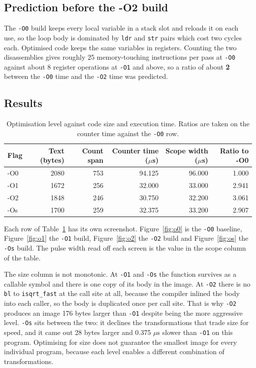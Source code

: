 \documentclass[11pt]{article}
\begin{document}
\subsection{Prediction before the -O2 build}

The \texttt{-O0} build keeps every local variable in a stack slot and reloads it
on each use, so the loop body is dominated by \texttt{ldr} and \texttt{str}
pairs which cost two cycles each. Optimised code keeps the same variables in
registers. Counting the two disassemblies gives roughly 25 memory-touching
instructions per pass at \texttt{-O0} against about 8 register operations at
\texttt{-O1} and above, so a ratio of about \textbf{2} between the \texttt{-O0}
time and the \texttt{-O2} time was predicted.

\subsection{Results}

\begin{table}[H]
\centering
\begin{tabular}{lrrrrr}
\toprule
Flag & Text (bytes) & Count span & Counter time ($\mu$s) & Scope width ($\mu$s) & Ratio to -O0 \\
\midrule
-O0 & 2080 & 753 & 94.125 & 96.000 & 1.000 \\
-O1 & 1672 & 256 & 32.000 & 33.000 & 2.941 \\
-O2 & 1848 & 246 & 30.750 & 32.200 & 3.061 \\
-Os & 1700 & 259 & 32.375 & 33.200 & 2.907 \\
\bottomrule
\end{tabular}
\caption{Optimisation level against code size and execution time. Ratios are
taken on the counter time against the \texttt{-O0} row.}
\label{tab:opt}
\end{table}

Each row of Table~\ref{tab:opt} has its own screenshot. Figure~\ref{fig:o0} is the \texttt{-O0}
baseline, Figure~\ref{fig:o1} the \texttt{-O1} build, Figure~\ref{fig:o2} the
\texttt{-O2} build and Figure~\ref{fig:os} the \texttt{-Os} build. The pulse
width read off each screen is the value in the scope column of the table.

The size column is not monotonic. At \texttt{-O1} and \texttt{-Os} the function
survives as a callable symbol and there is one copy of its body in the image. At
\texttt{-O2} there is no \texttt{bl} to \texttt{isqrt\_fast} at the call site
at all, because the compiler inlined the body into each caller, so the body is
duplicated once per call site. That is why \texttt{-O2} produces an image 176
bytes larger than \texttt{-O1} despite being the more aggressive level.
\texttt{-Os} sits between the two: it declines the transformations that trade
size for speed, and it came out 28 bytes larger and 0.375 $\mu$s slower than
\texttt{-O1} on this program. Optimising for size does not guarantee the
smallest image for every individual program, because each level enables a
different combination of transformations.
\end{document}
